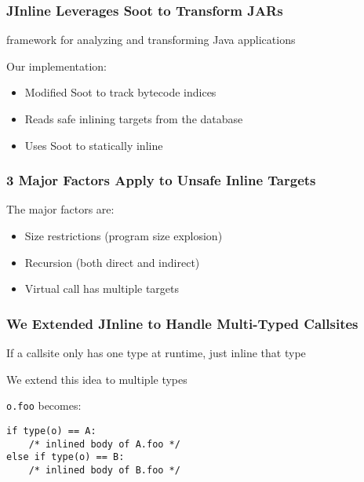 \documentclass[aspectratio=169]{beamer}
\begin{document}
  \begin{frame}
    \frametitle{JInline Leverages Soot to Transform JARs}

     framework for analyzing and transforming Java applications

    \vspace{2em}
    Our implementation:
    \begin{itemize}
      \item Modified Soot to track bytecode indices
      \item Reads safe inlining targets from the database
      \item Uses Soot to statically inline
    \end{itemize}
  \end{frame}

  \begin{frame}
    \frametitle{3 Major Factors Apply to Unsafe Inline Targets}

    The major factors are:
    \begin{itemize}
      \item Size restrictions (program size explosion)
      \item Recursion (both direct and indirect)
      \item Virtual call has multiple targets
    \end{itemize}
  \end{frame}

  \begin{frame}[fragile]
    \frametitle{We Extended JInline to Handle Multi-Typed Callsites}

    If a callsite only has one type at runtime, just inline that type

    \vspace{2em}

    We extend this idea to multiple types

    \vspace{4em}

    \texttt{o.foo} becomes:
    \begin{lstlisting}
if type(o) == A:
    /* inlined body of A.foo */
else if type(o) == B:
    /* inlined body of B.foo */
    \end{lstlisting}
  \end{frame}
\end{document}
